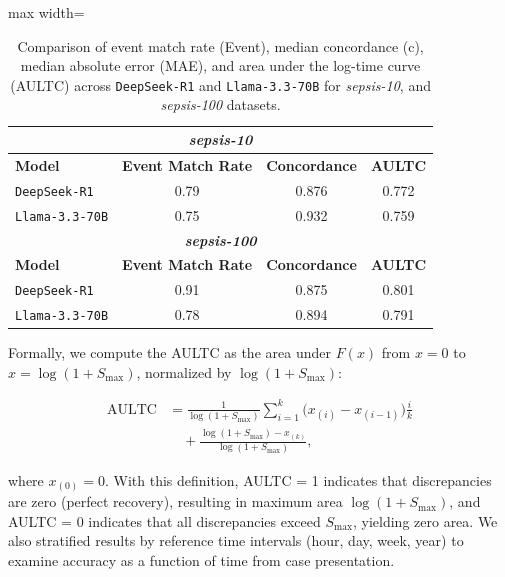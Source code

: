 \begin{table}[thbp]
\centering
\begin{adjustbox}{max width=\columnwidth}
\setlength{\tabcolsep}{4.5pt} %
\renewcommand{\arraystretch}{1.1}

\begin{tabular}{lccc}
\hline
\multicolumn{4}{c}{\textbf{\textit{sepsis-10}}} \\
\hline
\textbf{Model} & \textbf{Event Match Rate} & \textbf{Concordance} & \textbf{AULTC} \\
\texttt{DeepSeek-R1}      & 0.79 & 0.876 & 0.772 \\
\texttt{Llama-3.3-70B}    & 0.75 & 0.932 & 0.759 \\
\hline
\multicolumn{4}{c}{\textbf{\textit{sepsis-100}}} \\
\hline
\textbf{Model} & \textbf{Event Match Rate} & \textbf{Concordance} & \textbf{AULTC} \\
\texttt{DeepSeek-R1}      & 0.91 & 0.875 & 0.801 \\
\texttt{Llama-3.3-70B}    & 0.78 & 0.894 & 0.791 \\
\hline
\end{tabular}
\end{adjustbox}
\caption{Comparison of event match rate (Event), median concordance (c), median absolute error (MAE), and area under the log-time curve (AULTC) across \texttt{DeepSeek-R1} and \texttt{Llama-3.3-70B} for \textit{sepsis-10}, and \textit{sepsis-100} datasets.}
\label{tab:sepsis_onecol}
\end{table}


Formally, we compute the AULTC as the area under $F(x)$ from $x = 0$ to $x = \log(1 + S_{\text{max}})$, normalized by $\log(1 + S_{\text{max}})$:

\begin{equation*}
\label{eq:aultc}
\begin{aligned}
\text{AULTC}
&= \frac{1}{\log(1+S_{\max})}
   \sum_{i=1}^{k}\big(x_{(i)}-x_{(i-1)}\big)\frac{i}{k} \\
&\quad + \frac{\log(1+S_{\max})-x_{(k)}}{\log(1+S_{\max})},
\end{aligned}
\end{equation*}

where $x_{(0)} = 0$. With this definition, AULTC = 1 indicates that discrepancies are zero (perfect recovery), resulting in maximum area $\log(1 + S_{\text{max}})$, and AULTC = 0 indicates that all discrepancies exceed $S_{\text{max}}$, yielding zero area. We also stratified results by reference time intervals (hour, day, week, year) to examine accuracy as a function of time from case presentation.

